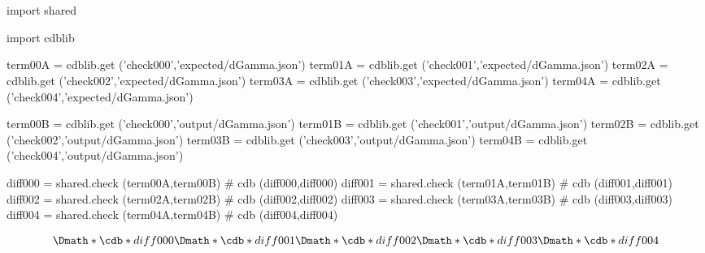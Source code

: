\documentclass[12pt]{cdblatex}
\begin{document}
\section*{\jobname}


\begin{cadabra}
   import shared

   import cdblib

   term00A = cdblib.get ('check000','expected/dGamma.json')
   term01A = cdblib.get ('check001','expected/dGamma.json')
   term02A = cdblib.get ('check002','expected/dGamma.json')
   term03A = cdblib.get ('check003','expected/dGamma.json')
   term04A = cdblib.get ('check004','expected/dGamma.json')

   term00B = cdblib.get ('check000','output/dGamma.json')
   term01B = cdblib.get ('check001','output/dGamma.json')
   term02B = cdblib.get ('check002','output/dGamma.json')
   term03B = cdblib.get ('check003','output/dGamma.json')
   term04B = cdblib.get ('check004','output/dGamma.json')

   diff000 = shared.check (term00A,term00B)   # cdb (diff000,diff000)
   diff001 = shared.check (term01A,term01B)   # cdb (diff001,diff001)
   diff002 = shared.check (term02A,term02B)   # cdb (diff002,diff002)
   diff003 = shared.check (term03A,term03B)   # cdb (diff003,diff003)
   diff004 = shared.check (term04A,term04B)   # cdb (diff004,diff004)

\end{cadabra}

\begin{dgroup*}
   \Dmath*{ \cdb*{diff000} }
   \Dmath*{ \cdb*{diff001} }
   \Dmath*{ \cdb*{diff002} }
   \Dmath*{ \cdb*{diff003} }
   \Dmath*{ \cdb*{diff004} }
\end{dgroup*}
\end{document}
